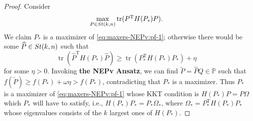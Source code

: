 \documentclass[11pt]{article}
\def\bbP{\mathbb{P}}
\def\wtd{\widetilde}
\def\what{\widehat}
\newcommand\STM[2]{{\rm St}(#1,#2)}
\DeclareMathOperator{\tr}{tr}
\DeclareMathOperator{\T}{T}
\theoremstyle{definition}
\numberwithin{equation}{section}
\begin{document}
\begin{proof}
Consider
\begin{equation}\label{eq:maxers-NEPv:pf-1}
\max_{P\in\STM{k}{n}}\tr(P^{\T}H(P_*) P).
\end{equation}
We claim $P_*$ is a maximizer of \eqref{eq:maxers-NEPv:pf-1}; otherwise there would be some
$\what P\in\STM{k}{n}$ such that
$$
\tr(\what P^{\T}H(P_*)\what P)\ge\tr(P_*^{\T}H(P_*)P_*)+\eta
$$
for some $\eta>0$. Invoking  {\bf the NEPv Ansatz}, we can find $\wtd P=\what PQ\in\bbP$ such that
$f(\wtd P)\ge f(P_*)+\omega\eta> f(P_*)$, contradicting that $P_*$ is a maximizer.
Thus $P_*$ is a maximizer of \eqref{eq:maxers-NEPv:pf-1} whose KKT condition is
$H(P_*)P=P\Omega$ which $P_*$ will have to satisfy, i.e.,
$H(P_*)P_*=P_*\Omega_*$, where $\Omega_*=P_*^{\T}H(P_*)P_*$ whose eigenvalues consists of
the $k$ largest ones of $H(P_*)$.
\end{proof}
\end{document}
